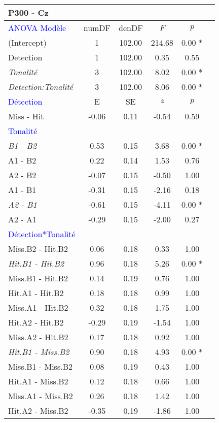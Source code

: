 \begin{landscape}
\begin{table}
\begin{multicols}{4}
\begin{tabular}{|l|*{5}{c|}}
\hline
\textbf{P300 - Cz} & & & & \\
\hline
\textcolor{blue}{ANOVA Modèle} & numDF & denDF & $F$ & $p$ \\ 
\hline
(Intercept) & 1 & 102.00 & 214.68 & 0.00 * \\ 
Detection & 1 & 102.00 & 0.35 & 0.55 \\ 
\textit{Tonalité} & 3 & 102.00 & 8.02 & 0.00 * \\ 
\textit{Detection:Tonalité} & 3 & 102.00 & 8.06 & 0.00 * \\ 
\hline
\textcolor{blue}{Détection} & E & SE & $z$ & $p$ \\
\hline
Miss - Hit & -0.06 & 0.11 & -0.54 & 0.59 \\ 
\hline
\textcolor{blue}{Tonalité} & & & & \\
\hline
\textit{B1 - B2} & 0.53 & 0.15 & 3.68 & 0.00 * \\ 
A1 - B2 & 0.22 & 0.14 & 1.53 & 0.76 \\ 
A2 - B2 & -0.07 & 0.15 & -0.50 & 1.00 \\ 
A1 - B1 & -0.31 & 0.15 & -2.16 & 0.18 \\ 
\textit{A2 - B1} & -0.61 & 0.15 & -4.11 & 0.00 * \\ 
A2 - A1 & -0.29 & 0.15 & -2.00 & 0.27 \\ 
\hline
\textcolor{blue}{Détection*Tonalité} & & & & \\
\hline
Miss.B2 - Hit.B2 & 0.06 & 0.18 & 0.33 & 1.00 \\ 
\textit{Hit.B1 - Hit.B2} & 0.96 & 0.18 & 5.26 & 0.00 * \\ 
Miss.B1 - Hit.B2 & 0.14 & 0.19 & 0.76 & 1.00 \\ 
Hit.A1 - Hit.B2 & 0.18 & 0.18 & 0.99 & 1.00 \\ 
Miss.A1 - Hit.B2 & 0.32 & 0.18 & 1.75 & 1.00 \\ 
Hit.A2 - Hit.B2 & -0.29 & 0.19 & -1.54 & 1.00 \\ 
Miss.A2 - Hit.B2 & 0.17 & 0.18 & 0.92 & 1.00 \\ 
\textit{Hit.B1 - Miss.B2} & 0.90 & 0.18 & 4.93 & 0.00 * \\ 
Miss.B1 - Miss.B2 & 0.08 & 0.19 & 0.43 & 1.00 \\ 
Hit.A1 - Miss.B2 & 0.12 & 0.18 & 0.66 & 1.00 \\ 
Miss.A1 - Miss.B2 & 0.26 & 0.18 & 1.42 & 1.00 \\ 
Hit.A2 - Miss.B2 & -0.35 & 0.19 & -1.86 & 1.00 \\ 

\end{tabular}
\end{multicols}
\end{table}
\end{landscape}
